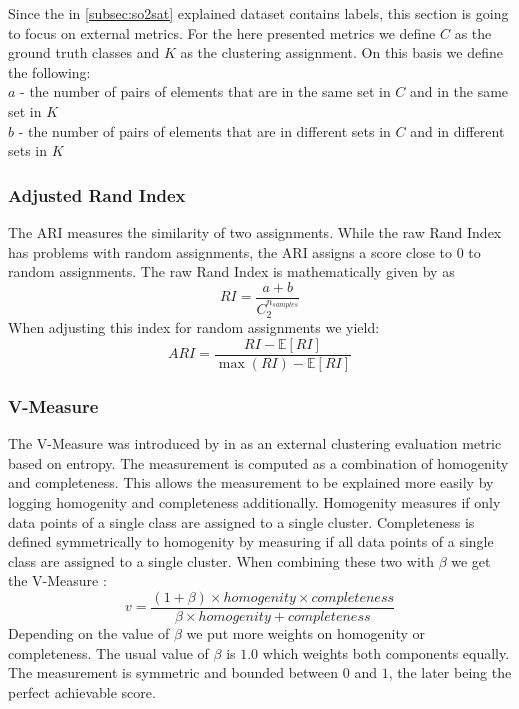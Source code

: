 Since the in \cref{subsec:so2sat} explained dataset contains labels, this section is going to focus on external metrics.
For the here presented metrics we define \(C\) as the ground truth classes and \(K\) as the clustering assignment.
On this basis we define the following:\\
\(a\) - the number of pairs of elements that are in the same set in \(C\) and in the same set in \(K\)\\
\(b\) - the number of pairs of elements that are in different sets in \(C\) and in different sets in \(K\)\\


\subsubsection{Adjusted Rand Index}
The \gls{ARI} measures the similarity of two assignments. While the raw Rand Index has problems with random assignments, the \gls{ARI} assigns a score close to \(0\)
to random assignments.
The raw Rand Index is mathematically given by \cite{noauthor_23_2020} as
\[RI = \frac{a + b}{C_2^{n_{samples}}}\]
When adjusting this index for random assignments we yield:
\[ARI = \frac{RI - \mathbb{E} [RI]}{\max (RI) - \mathbb{E} [RI]}\]


\subsubsection{V-Measure}
\label{ssec:v_measure}
The V-Measure was introduced by \citeauthor{rosenberg_v-measure_2007} in \cite{rosenberg_v-measure_2007} as an external clustering evaluation metric based on entropy.
The measurement is computed as a combination of homogenity and completeness. This allows the measurement to be explained more easily by logging homogenity and completeness additionally.
Homogenity measures if only data points of a single class are assigned to a single cluster. Completeness is defined symmetrically to homogenity by measuring if all data points of a single class are assigned to
a single cluster.
When combining these two with \(\beta\) we get the V-Measure \cite{noauthor_23_2020}:
\[v = \frac{(1 + \beta) \times \mathit{homogenity} \times \mathit{completeness}}{\beta \times \mathit{homogenity} + \mathit{completeness}}\]
Depending on the value of \(\beta\) we put more weights on homogenity or completeness. The usual value of \(\beta\) is \(1.0\) which weights both components equally.
The measurement is symmetric and bounded between \(0\) and \(1\), the later being the perfect achievable score.



